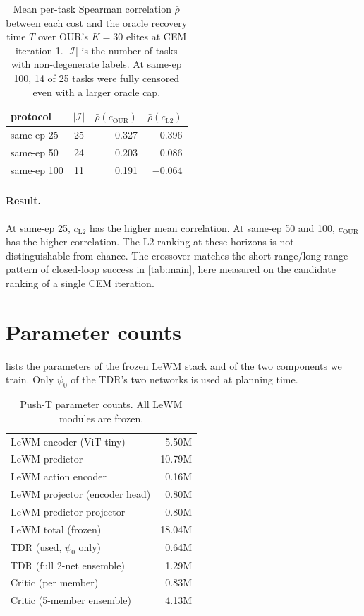 \documentclass{article} %
\begin{document}
\begin{table}[h]
\centering\small
\caption{Mean per-task Spearman correlation $\bar\rho$ between each cost and the oracle recovery
time $T$ over OUR's $K=30$ elites at CEM iteration 1. $|\mathcal{I}|$ is the number of tasks with
non-degenerate labels. At same-ep 100, 14 of 25 tasks were fully censored even with a larger
oracle cap.}
\label{tab:cem-trace-rho}
\begin{tabular}{lcrr}
\toprule
protocol & $|\mathcal{I}|$ & $\bar\rho(c_{\mathrm{OUR}})$ & $\bar\rho(c_{\mathrm{L2}})$ \\
\midrule
same-ep 25  & 25 & 0.327  & 0.396 \\
same-ep 50  & 24 & 0.203  & 0.086 \\
same-ep 100 & 11 & 0.191  & $-$0.064 \\
\bottomrule
\end{tabular}
\end{table}

\paragraph{Result.} At same-ep 25, $c_{\mathrm{L2}}$ has the higher mean correlation. At same-ep 50 and 100, $c_{\mathrm{OUR}}$ has the
higher correlation. The L2 ranking at these horizons is not distinguishable
from chance. The crossover matches the short-range/long-range pattern of closed-loop success in
\cref{tab:main}, here measured on the candidate ranking of a single CEM iteration.

\section{Parameter counts}
\label{app:params}
 lists the parameters of the frozen LeWM stack and of the two components we
train. Only $\psi_0$ of the TDR's two networks is used at planning time.

\begin{table}[h]
\centering\small
\caption{Push-T parameter counts. All LeWM modules are frozen. }
\label{tab:params}
\begin{tabular}{lr}
\toprule
LeWM encoder (ViT-tiny) & 5.50M \\
LeWM predictor & 10.79M \\
LeWM action encoder & 0.16M \\
LeWM projector (encoder head) & 0.80M \\
LeWM predictor projector & 0.80M \\
\quad LeWM total (frozen) & 18.04M \\
\midrule
TDR (used, $\psi_0$ only) & 0.64M \\
TDR (full 2-net ensemble) & 1.29M \\
Critic (per member) & 0.83M \\
Critic (5-member ensemble) & 4.13M \\
\bottomrule
\end{tabular}
\end{table}
\end{document}
